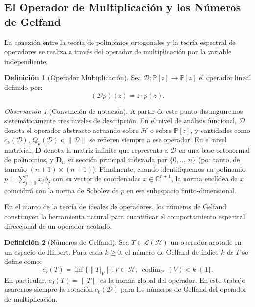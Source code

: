 \documentclass[12pt,a4paper]{article}
\theoremstyle{definition}
\newtheorem{definition}{Definición}
\theoremstyle{remark}
\newtheorem{remark}{Observación}
\newcommand{\Poly}{\mathbb{P}[z]}
\begin{document}
\subsection{El Operador de Multiplicación y los Números de Gelfand}

La conexión entre la teoría de polinomios ortogonales y la teoría espectral de operadores se realiza a través del operador de multiplicación por la variable independiente.

\begin{definition}[Operador Multiplicación] \label{def:operador_multiplicacion}
	Sea $\mathcal{D}: \Poly \to \Poly$ el operador lineal definido por:
	\begin{equation}
		(\mathcal{D} p)(z) = z \cdot p(z).
	\end{equation}
\end{definition}

\begin{remark}[Convención de notación]
	A partir de este punto distinguiremos sistemáticamente tres niveles de descripción. En el nivel de análisis funcional, $\mathcal{D}$ denota el operador abstracto actuando sobre $\mathcal{H}$ o sobre $\Poly$, y cantidades como $c_k(\mathcal{D})$, $Q_k(\mathcal{D})$ o $\|\mathcal{D}\|$ se refieren siempre a ese operador. En el nivel matricial, $\mathbf{D}$ denota la matriz infinita que representa a $\mathcal{D}$ en una base ortonormal de polinomios, y $\mathbf{D}_n$ su sección principal indexada por $\{0,\dots,n\}$ (por tanto, de tamaño $(n+1)\times(n+1)$). Finalmente, cuando identifiquemos un polinomio $p = \sum_{j=0}^{n} x_j \phi_j$ con su vector de coordenadas $x \in \mathbb{C}^{n+1}$, la norma euclídea de $x$ coincidirá con la norma de Sobolev de $p$ en ese subespacio finito-dimensional.
\end{remark}

En el marco de la teoría de ideales de operadores, los números de Gelfand constituyen la herramienta natural para cuantificar el comportamiento espectral direccional de un operador acotado.

\begin{definition}[Números de Gelfand]\label{def:numeros_gelfand}
	Sea $T \in \mathcal{L}(\mathcal{H})$ un operador acotado en un espacio de Hilbert. Para cada $k\ge 0$, el número de Gelfand de índice $k$ de $T$ se define como:
	\begin{equation}
		c_k(T) = \inf \{ \|T|_V\| : V \subset \mathcal{H}, \; \operatorname{codim}_{\mathcal{H}}(V) < k+1 \}.
	\end{equation}
	En particular, $c_0(T) = \|T\|$ es la norma global del operador. En este trabajo usaremos siempre la notación $c_k(\mathcal{D})$ para los números de Gelfand del operador de multiplicación.
\end{definition}
\end{document}
